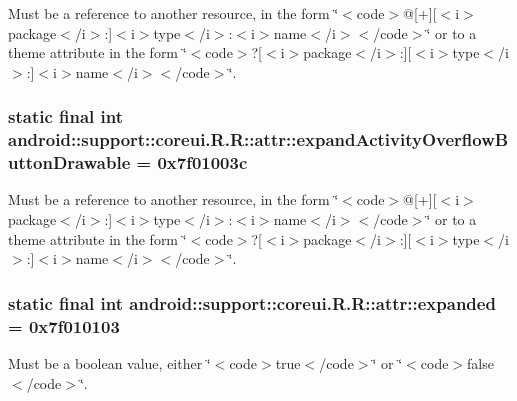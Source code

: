 Must be a reference to another resource, in the form \char`\"{}$<$code$>$@\mbox{[}+\mbox{]}\mbox{[}$<$i$>$package$<$/i$>$:\mbox{]}$<$i$>$type$<$/i$>$:$<$i$>$name$<$/i$>$$<$/code$>$\char`\"{} or to a theme attribute in the form \char`\"{}$<$code$>$?\mbox{[}$<$i$>$package$<$/i$>$:\mbox{]}\mbox{[}$<$i$>$type$<$/i$>$:\mbox{]}$<$i$>$name$<$/i$>$$<$/code$>$\char`\"{}. \hypertarget{classandroid_1_1support_1_1coreui_1_1_r_1_1attr_01bcb48c9bbc049d0eee0ff9cb9869cc}{
\subsubsection[{expandActivityOverflowButtonDrawable}]{\setlength{\rightskip}{0pt plus 5cm}static final int android::support::coreui.R.R::attr::expandActivityOverflowButtonDrawable = 0x7f01003c}}
\label{classandroid_1_1support_1_1coreui_1_1_r_1_1attr_01bcb48c9bbc049d0eee0ff9cb9869cc}


Must be a reference to another resource, in the form \char`\"{}$<$code$>$@\mbox{[}+\mbox{]}\mbox{[}$<$i$>$package$<$/i$>$:\mbox{]}$<$i$>$type$<$/i$>$:$<$i$>$name$<$/i$>$$<$/code$>$\char`\"{} or to a theme attribute in the form \char`\"{}$<$code$>$?\mbox{[}$<$i$>$package$<$/i$>$:\mbox{]}\mbox{[}$<$i$>$type$<$/i$>$:\mbox{]}$<$i$>$name$<$/i$>$$<$/code$>$\char`\"{}. \hypertarget{classandroid_1_1support_1_1coreui_1_1_r_1_1attr_87f05afae42c7d0b49befef9dfc29d1a}{
\subsubsection[{expanded}]{\setlength{\rightskip}{0pt plus 5cm}static final int android::support::coreui.R.R::attr::expanded = 0x7f010103}}
\label{classandroid_1_1support_1_1coreui_1_1_r_1_1attr_87f05afae42c7d0b49befef9dfc29d1a}


Must be a boolean value, either \char`\"{}$<$code$>$true$<$/code$>$\char`\"{} or \char`\"{}$<$code$>$false$<$/code$>$\char`\"{}. 

